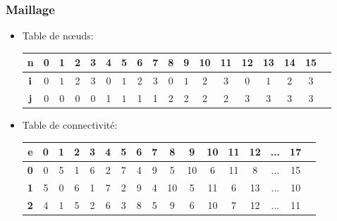 \documentclass{beamer}
\begin{document}
\begin{frame}
\frametitle{Maillage}
\begin{itemize}
\item  Table de nœuds:
\begin{center}
\begin{tabular}{|c|c|c|c|c|c|c|c|c|c|c|c|c|c|c|c|c|c|}\hline 
{\bf n} & 0 & 1 & 2 & 3 &4 &5 &6 & 7 & 8 &9 &10 & 11  & 12 &13 &14 & 15\\ \hline 
$\mbox{\bf i} $& $0$ & $1$ & 2 & 3 & $0$ & $1$ & 2 & 3& $0$ & $1$ & 2 & 3& $0$ & $1$ & 2 & 3\\ \hline 
$\mbox{\bf j} $& $0$ & $0$ & 0 & 0 & 1 & $1$ & 1 & 1&2&2&2&2  &3&3&3&3\\ \hline 
\end{tabular}
\end{center}
\item Table de connectivité:
\begin{center}
\begin{tabular}{|c|c|c|c|c|c|c|c|c|c|c|c|c|c|c|c|c|}\hline 
{\bf e} & 0 & 1 & 2 & 3 & 4 & 5 & 6 & 7 & 8 &9  &10 & 11  & 12 &... & 17\\ \hline 
{\bf 0}& 0  & 5 & 1 & 6 & 2 & 7 & 4 & 9& 5 &10 & 6 & 11 & 8 & ... &  15\\ \hline 
{\bf 1}& 5 & 0  & 6 & 1 & 7 & 2 & 9 & 4&10&5  &11 &6   &13&... &10\\ \hline 
{\bf 2}& 4 & 1  & 5 & 2 & 6 & 3 & 8 & 5&9 &6  &10  &7   &12&... &11\\ \hline 
\end{tabular}
\end{center}
\end{itemize}




\end{frame}
\end{document}
